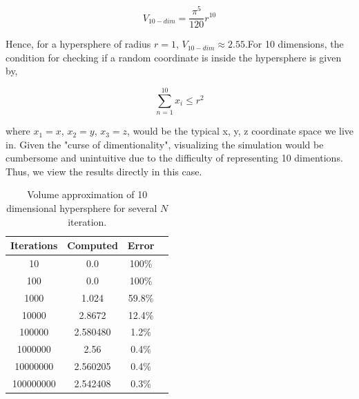 \documentclass{article}
\begin{document}
\begin{equation} \label{eq:ten_dim_volume}
  V_{10-dim} = \frac{\pi^5}{120} r^{10}
\end{equation}

Hence, for a hypersphere of radius $r = 1$, $ V_{10-dim} \approx 2.55$.For 10 dimensions, the condition for checking if a
random coordinate is inside the hypersphere is given by,

\begin{equation} \label{eq:ten_dim_cond}
    \sum_{n=1}^{10}x_{i} \leq r^2
\end{equation}

where $x_{1} = x$, $x_{2} = y$, $x_{3} = z$, would be the typical x, y, z coordinate space we live in. Given the "curse of dimentionality",
visualizing the simulation would be cumbersome and unintuitive due to the difficulty of representing 10 dimentions. Thus, we view the results
directly in this case.

\begin{table}[H]
  \begin{center}
    \begin{tabular}{|c|c|c|c|}
      \hline
      Iterations & Computed & Error \\
      \hline
      10 & 0.0 & 100\% \\
      \hline
      100 & 0.0 & 100\% \\
      \hline
      1000 & 1.024 & 59.8\% \\
      \hline
      10000 & 2.8672 & 12.4\% \\
      \hline
      100000 & 2.580480 & 1.2\% \\
      \hline
      1000000 & 2.56 & 0.4\% \\
      \hline
      10000000 & 2.560205 & 0.4\% \\
      \hline
      100000000 & 2.542408 & 0.3\% \\
      \hline
    \end{tabular}
  \end{center}
  \caption {Volume approximation of 10 dimensional hypersphere for several  $N$ iteration.}
  \label{tab:circle_results}
\end{table}
\end{document}
